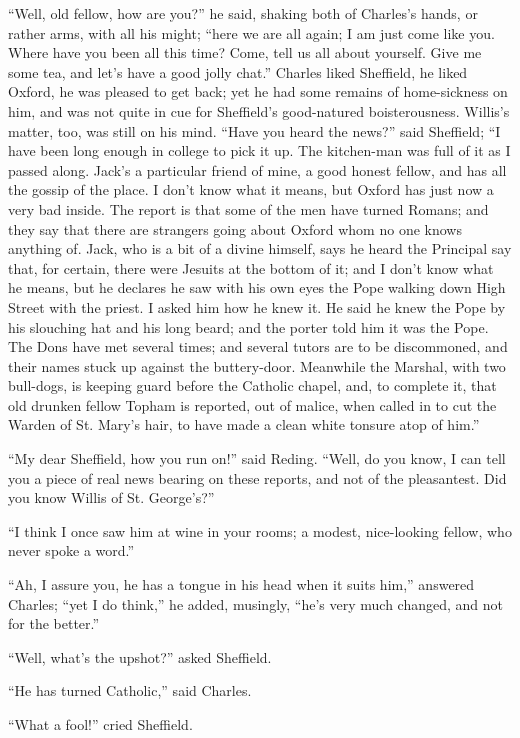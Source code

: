 ``Well, old fellow, how are you?'' he said, shaking both of
Charles's hands, or rather arms, with all his might; ``here we are
all again; I am just come like you. Where have you been all this
time? Come, tell us all about yourself. Give me some tea, and let's
have a good jolly chat.'' Charles liked Sheffield, he liked
Oxford, he was pleased to get back; yet he had some remains of
home-sickness on him, and was not quite in cue for Sheffield's
good-natured boisterousness. Willis's matter, too, was still on his
mind. ``Have you heard the news?'' said Sheffield; ``I
have been long enough in college to pick it up. The kitchen-man was
full of it as I passed along. Jack's a particular friend of mine, a
good honest fellow, and has all the gossip of the place. I don't know
what it means, but Oxford has just now a very bad inside. The report
is that some of the men have turned Romans; and they say that there
are strangers going about Oxford whom no one knows anything of. Jack,
who is a bit of a divine himself, says he heard the Principal say
that, for certain, there were Jesuits at the bottom of it; and I don't
know what he means, but he declares he saw with his own eyes the Pope
walking down High Street with the priest. I asked him how he knew it.
He said he knew the Pope by his slouching hat and his long beard; and
the porter told him it was the Pope. The Dons have met several times;
and several tutors are to be discommoned, and their names stuck up
against the buttery-door. Meanwhile the Marshal, with two bull-dogs,
is keeping guard before the Catholic chapel, and, to complete it, that
old drunken fellow Topham is reported, out of malice, when called in
to cut the Warden of St. Mary's hair, to have made a clean white
tonsure atop of him.''

``My dear Sheffield, how you run on!'' said Reding.
``Well, do you know, I can tell you a piece of real news bearing
on these reports, and not of the pleasantest. Did you know Willis of
St. George's?''

``I think I once saw him at wine in your rooms; a modest,
nice-looking fellow, who never spoke a word.''

``Ah, I assure you, he has a tongue in his head when it suits
him,'' answered Charles; ``yet I do think,'' he added,
musingly, ``he's very much changed, and not for the better.''

``Well, what's the upshot?'' asked Sheffield.

``He has turned Catholic,'' said Charles.

``What a fool!'' cried Sheffield.

